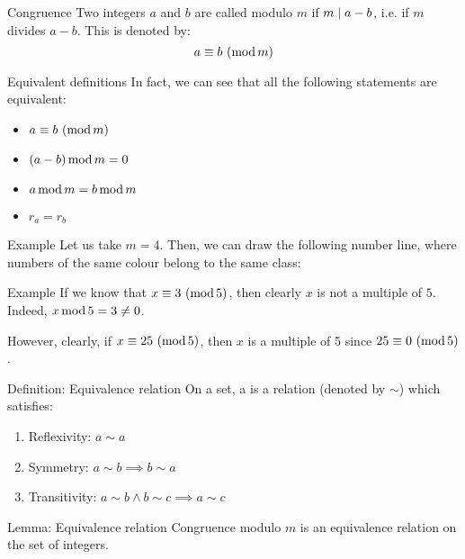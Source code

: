 \documentclass[a4paper]{article}
\begin{document}
\begin{parag}{Congruence}
    Two integers $a$ and $b$ are called  modulo $m$ if $m \mid a - b$, i.e. if $m$ divides $a - b$. This is denoted by: 
    \[a \equiv b\ (\operatorname{mod} m)\]
    
    \begin{subparag}{Equivalent definitions}
        In fact, we can see that all the following statements are equivalent:
        \begin{itemize}
            \item $a \equiv b\ (\operatorname{mod} m)$
            \item $\left(a - b\right) \Mod m = 0$
            \item $a \operatorname{mod} m = b \operatorname{mod} m$
            \item $r_a = r_b$
        \end{itemize}
    \end{subparag}

    \begin{subparag}{Example}
        Let us take $m = 4$. Then, we can draw the following number line, where numbers of the same colour belong to the same class:
    \end{subparag}
\end{parag}

\begin{parag}{Example}
    If we know that $x \equiv 3\ (\operatorname{mod} 5)$, then clearly $x$ is not a multiple of $5$. Indeed, $x \operatorname{mod} 5 = 3 \neq 0$.

    However, clearly, if $x \equiv 25\ (\operatorname{mod} 5)$, then $x$ is a multiple of 5 since $25 \equiv 0\ (\operatorname{mod} 5)$.
\end{parag}

\begin{parag}{Definition: Equivalence relation}
    On a set, a  is a relation (denoted by $\sim$) which satisfies:
    \begin{enumerate}
        \item Reflexivity: $a \sim a$
        \item Symmetry: $a \sim b \implies b \sim a$
        \item Transitivity: $a \sim b \land b \sim c \implies a \sim c$
    \end{enumerate}
\end{parag}

\begin{parag}{Lemma: Equivalence relation}
    Congruence modulo $m$ is an equivalence relation on the set of integers.
\end{parag}
\end{document}
